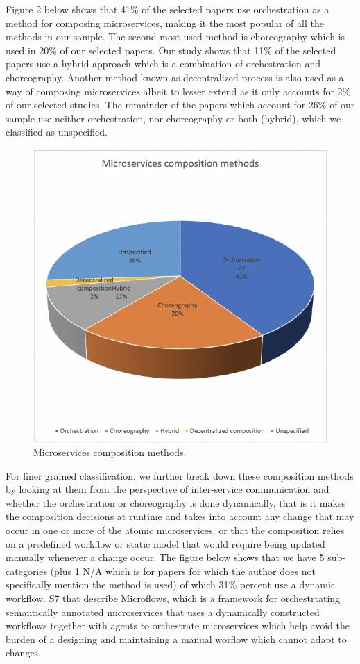\documentclass{article}
\begin{document}
\begin{multicols}{2}
Figure 2 below shows that 41\% of the selected papers use orchestration as a method for composing microservices, making it the most popular of all the methods in our sample. The second most used method is choreography which is used in 20\% of our selected papers. Our study shows that 11\% of the selected papers use a hybrid approach which is a combination of orchestration and choreography. Another method known as decentralized process is also used as a way of composing microservices albeit to lesser extend as it only accounts for 2\% of our selected studies. The remainder of the papers which account for 26\% of our sample use neither orchestration, nor choreography or both (hybrid), which we classified as unspecified.

\begin{figure}[htbp]
 \centerline{\includegraphics[scale=0.60]{mscompcore.png}}
  \caption{Microservices composition methods.}
  \label{fig}
\end{figure}

For finer grained classification, we further break down these composition methods by looking at them from the perspective of inter-service communication and whether the orchestration or choreography is done dynamically, that is it makes the composition decisions at runtime and takes into account any change that may occur in one or more of the atomic microservices, or that the composition relies on a predefined workflow or static model that would require being updated manually whenever a change occur. The figure below shows that we have 5 sub-categories (plus 1 N/A which is for papers for which the author does not specifically mention the method is used) of which 31\% percent  use a dynamic workflow. S7 that describe Microflows, which is a framework for orchestrtating semantically annotated microservices that uses a dynamically constructed workflows together with agents to orchestrate microservices which help avoid the burden of a designing and maintaining a manual worflow which cannot adapt to changes. 


\end{multicols}
\end{document}
